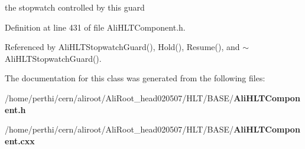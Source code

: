 the stopwatch controlled by this guard 

Definition at line 431 of file Ali\-HLTComponent.h.

Referenced by Ali\-HLTStopwatch\-Guard(), Hold(), Resume(), and $\sim$Ali\-HLTStopwatch\-Guard().

The documentation for this class was generated from the following files:\begin{CompactItemize}
\item 
/home/perthi/cern/aliroot/Ali\-Root\_\-head020507/HLT/BASE/{\bf Ali\-HLTComponent.h}\item 
/home/perthi/cern/aliroot/Ali\-Root\_\-head020507/HLT/BASE/{\bf Ali\-HLTComponent.cxx}\end{CompactItemize}

